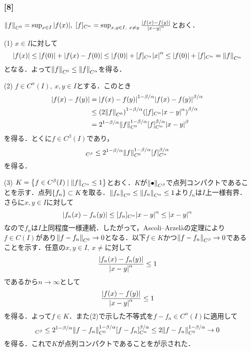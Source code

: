 \documentclass[a4j]{ltjsarticle}
\newcommand{\1}{\mathbbm{1}}
\numberwithin{equation}{section}
\theoremstyle{definition}
\begin{document}
\subsubsection*{[8]}
$\norm{f}_{C^0}=\sup_{x\in I}\abs{f(x)},\ [f]_{C^{\alpha}}=\sup_{x,y\in I,\ x\neq y}\frac{\abs{f(x)-f(y)}}{\abs{x-y}^{\alpha}}$とおく．

(1) $x\in I$に対して
\begin{equation}
    \abs{f(x)}\leq \abs{f(0)}+\abs{f(x)-f(0)}\leq \abs{f(0)}+[f]_{C^{\alpha}}\abs{x}^{\alpha}\leq \abs{f(0)}+[f]_{C^{\alpha}}=\norm{f}_{C^{\alpha}} 
\end{equation}
となる．よって$\norm{f}_{C^{0}}\leq \norm{f}_{C^\alpha}$を得る．

(2) $f\in C^\alpha(I),\ x,y\in I$とする．このとき
\begin{align}
    \abs{f(x)-f(y)}&=\abs{f(x)-f(y)}^{1-\beta/\alpha}\abs{f(x)-f(y)}^{\beta/\alpha}\\
    &\leq \qty(2\norm{f}_{C^{0}})^{1-\beta/\alpha}\qty([f]_{C^\alpha}\abs{x-y}^\alpha)^{\beta/\alpha}\\
    &=2^{1-\beta/\alpha}\norm{f}_{C^0}^{1-\beta/\alpha}[f]_{C^{\alpha}}^{\beta/\alpha}\abs{x-y}^\beta 
\end{align}
を得る．とくに$f\in C^\beta(I)$であり，
\begin{equation}
    [f]_{C^\beta}\leq 2^{1-\beta/\alpha}\norm{f}_{C^0}^{1-\beta/\alpha}[f]_{C^\alpha}^{\beta/\alpha }
\end{equation}
を得る．

(3) $K=\qty{f\in C^\beta(I)\mid \norm{f}_{C^\alpha}\leq 1}$とおく．$K$が$\norm{\bullet}_{C^\beta}$で点列コンパクトであることを示す．点列$\qty{f_n}\subset K$を取る．$\norm{f_n}_{C^0}\leq \norm{f_n}_{C^\alpha}\leq 1$より$f_n$は$I$上一様有界．さらに$x,y\in I$に対して
\begin{equation}
    \abs{f_n(x)-f_n(y)}\leq [f_n]_{C^\alpha}\abs{x-y}^{\alpha}\leq \abs{x-y}^{\alpha} 
\end{equation}
なので$f_n$は$I$上同程度一様連続．したがって，Ascoli--Arzelàの定理により$f\in C(I)$があり$\norm{f-f_n}_{C^0}\to0$となる．以下$f\in K$かつ$\norm{f-f_n}_{C^\beta}\to0$であることを示す．任意の$x,y\in I,\ x\neq $に対して
\begin{equation}
    \frac{\abs{f_n(x)-f_n(y)}}{\abs{x-y}^\alpha}\leq 1
\end{equation}
であるから$n\to\infty$として
\begin{equation}
    \frac{\abs{f(x)-f(y)}}{\abs{x-y}^{\alpha}}\leq1
\end{equation}
を得る．よって$f\in K$．また(2)で示した不等式を$f-f_n\in C^\alpha(I)$に適用して
\begin{equation}
    [f-f_n]_{C^\beta}\leq 2^{1-\beta/\alpha}\norm{f-f_n}_{C^0}^{1-\beta/\alpha}[f-f_n]_{C^\alpha}^{\beta/\alpha}\leq 2\norm{f-f_n}_{C^0}^{1-\beta/\alpha}\to0
\end{equation}
を得る．これで$K$が点列コンパクトであることをが示された．
\end{document}
